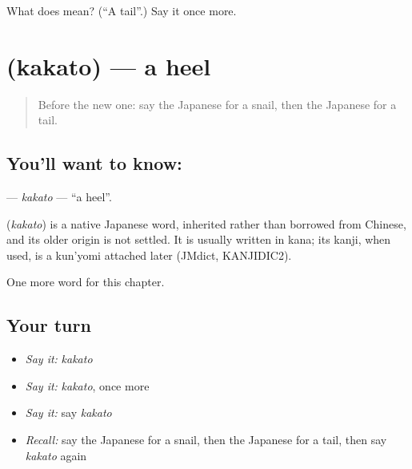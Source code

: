 \begin{tcolorbox}[breakable,colback=teal!4,colframe=teal!35!black,title={Before you move on}]
What does  mean? (\textquotedblleft{}A tail\textquotedblright{}.) Say it once more.
\end{tcolorbox}
\section[\texorpdfstring{\ja{かかと} (kakato)}{かかと (kakato)}]{ (kakato) — a heel}

\label{lesson:JA-C110-kakato}



\begin{quote}
Before the new one: say the Japanese for a snail, then the Japanese for a tail.
\end{quote}

\subsection*{You'll want to know: }
\textbf{} — \emph{kakato} — \textquotedblleft{}a heel\textquotedblright{}.

\begin{cousinweb}
\textbf{} (\emph{kakato}) is a native Japanese word, inherited rather than borrowed from Chinese, and its older origin is not settled. It is usually written in kana; its kanji, when used, is a kun'yomi attached later (JMdict, KANJIDIC2).
\end{cousinweb}

\begin{grammarlens}[title={What you've built}]
One more word for this chapter.
\end{grammarlens}

\subsection*{Your turn}
\begin{itemize}
\raggedright
  \item \emph{Say it:} \emph{kakato}
  \item \emph{Say it:} \emph{kakato}, once more
  \item \emph{Say it:} say \emph{kakato}
  \item \emph{Recall:} say the Japanese for a snail, then the Japanese for a tail, then say \emph{kakato} again
\end{itemize}

